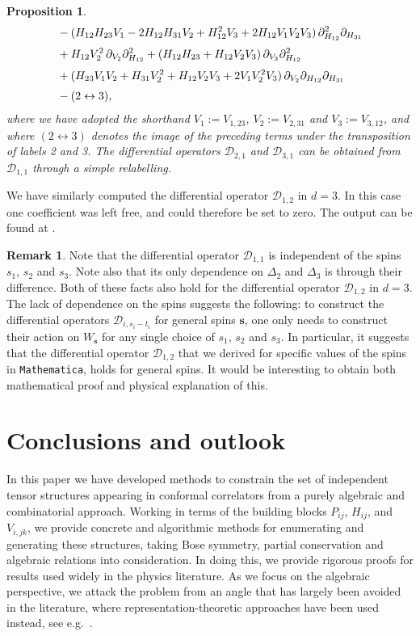 \documentclass[12pt,a4paper]{extarticle}
\newtheorem{proposition}[theorem]{Proposition}
\theoremstyle{definition}
\newtheorem{remark}[theorem]{Remark}
\begin{document}
\begin{proposition}
\begin{align}
&  - (H_{12}H_{23}V_1 - 2H_{12}H_{31}V_2 + H_{12}^2 V_3 + 2H_{12}V_1 V_2 V_3)\,\partial_{H_{12}}^2\partial_{H_{31}} \notag\\[3pt]
&+ H_{12} V_2^2\,\partial_{V_2}\partial_{H_{12}}^2 + (H_{12}H_{23} + H_{12}V_2 V_3)\,\partial_{V_3}\partial_{H_{12}}^2\notag \\[3pt]
& + (H_{23}V_1 V_2 + H_{31}V_2^2 + H_{12}V_2 V_3 + 2V_1 V_2^2 V_3)\,\partial_{V_2}\partial_{H_{12}}\partial_{H_{31}} \notag\\[3pt]
& - (2\leftrightarrow 3), \notag
\end{align}
where we have adopted the shorthand $V_1:=V_{1,23}$, $V_2:=V_{2,31}$ and $V_3:=V_{3,12}$, and where $(2\leftrightarrow 3)$ denotes the image of the preceding terms under the transposition of labels 2 and 3. The differential operators $\mathcal{D}_{2,1}$ and $\mathcal{D}_{3,1}$ can be obtained from $\mathcal{D}_{1,1}$ through a simple relabelling.
\end{proposition}

We have similarly computed the differential operator $\mathcal{D}_{1,2}$ in $d=3$. In this case one coefficient was left free, and could therefore be set to zero. The output can be found at \cite{zenodo}. 

\begin{remark}
    Note that the differential operator $\mathcal{D}_{1,1}$ is independent of the spins $s_1$, $s_2$ and $s_3$. Note also that its only dependence on $\Delta_2$ and $\Delta_3$ is through their difference. Both of these facts also hold for the differential operator $\mathcal{D}_{1,2}$ in $d=3$. The lack of dependence on the spins suggests the following: to construct the differential operators $\mathcal{D}_{i,s_i-t_i}$ for general spins $\mathbf{s}$, one only needs to construct their action on $W_{\mathbf{s}}$ for any single choice of $s_1$, $s_2$ and $s_3$. In particular, it suggests that the differential operator $\mathcal{D}_{1,2}$ that we derived for specific values of the spins in \texttt{Mathematica}, holds for general spins. It would be interesting to obtain both mathematical proof and physical explanation of this. 
\end{remark}

\section{Conclusions and outlook}

In this paper we have developed methods to constrain the set of independent tensor structures appearing in conformal correlators from a purely algebraic and combinatorial approach. Working in terms of the building blocks $P_{ij}$, $H_{ij}$, and $V_{i,jk}$, we provide concrete and algorithmic methods for enumerating and generating these structures, taking Bose symmetry, partial conservation and algebraic relations into consideration. In doing this, we provide rigorous proofs for results used widely in the physics literature. As we focus on the algebraic perspective, we attack the problem from an angle that has largely been avoided in the literature, where representation-theoretic approaches have been used instead, see e.g.~\cite{DKKPS, KSD}.
\end{document}
